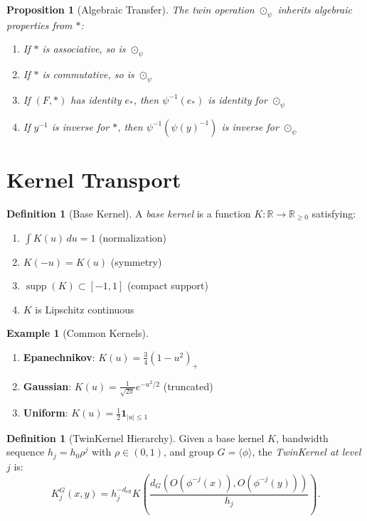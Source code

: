 \documentclass[11pt,twoside,openright]{book}
\theoremstyle{plain}
\newtheorem{proposition}[theorem]{Proposition}
\theoremstyle{definition}
\newtheorem{definition}[theorem]{Definition}
\newtheorem{example}[theorem]{Example}
\theoremstyle{remark}
\newcommand{\Rd}{\mathbb{R}}
\newcommand{\deff}{d_{\mathrm{eff}}}
\newcommand{\twin}{\odot}
\DeclareMathOperator{\supp}{supp}
\begin{document}
\begin{proposition}[Algebraic Transfer]
The twin operation $\twin_\psi$ inherits algebraic properties from $*$:
\begin{enumerate}[label=(\roman*)]
\item If $*$ is associative, so is $\twin_\psi$
\item If $*$ is commutative, so is $\twin_\psi$
\item If $(F, *)$ has identity $e_*$, then $\psi^{-1}(e_*)$ is identity for $\twin_\psi$
\item If $y^{-1}$ is inverse for $*$, then $\psi^{-1}(\psi(y)^{-1})$ is inverse for $\twin_\psi$
\end{enumerate}
\end{proposition}

\section{Kernel Transport}

\begin{definition}[Base Kernel]
A \emph{base kernel} is a function $K : \Rd \to \Rd_{\geq 0}$ satisfying:
\begin{enumerate}[label=(\roman*)]
\item $\int K(u) \, du = 1$ (normalization)
\item $K(-u) = K(u)$ (symmetry)
\item $\supp(K) \subset [-1, 1]$ (compact support)
\item $K$ is Lipschitz continuous
\end{enumerate}
\end{definition}

\begin{example}[Common Kernels]
\begin{enumerate}
\item \textbf{Epanechnikov}: $K(u) = \frac{3}{4}(1 - u^2)_+$
\item \textbf{Gaussian}: $K(u) = \frac{1}{\sqrt{2\pi}} e^{-u^2/2}$ (truncated)
\item \textbf{Uniform}: $K(u) = \frac{1}{2} \mathbf{1}_{|u| \leq 1}$
\end{enumerate}
\end{example}

\begin{definition}[TwinKernel Hierarchy]
\label{def:twinkernel}
Given a base kernel $K$, bandwidth sequence $h_j = h_0 \rho^j$ with $\rho \in (0,1)$, and group $G = \langle \phi \rangle$, the \emph{TwinKernel at level $j$} is:
\begin{equation}
K_j^G(x, y) = h_j^{-\deff} K\left(\frac{d_G(O(\phi^{-j}(x)), O(\phi^{-j}(y)))}{h_j}\right).
\label{eq:twinkernel}
\end{equation}
\end{definition}
\end{document}

